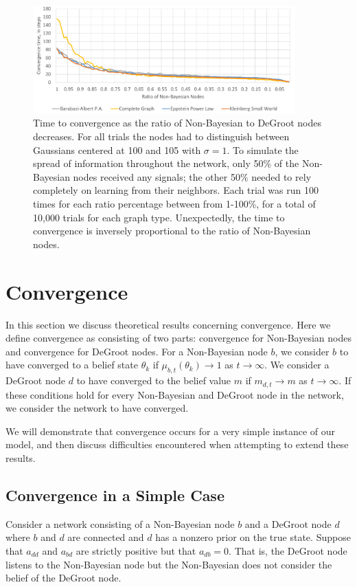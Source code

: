 \documentclass[letterpaper, 11pt, conference]{ieeeconf}
\begin{document}
\begin{figure}[t]
\centering
\includegraphics[width=0.9\textwidth]{figures/nb_ratio}
\caption{Time to convergence as the ratio of Non-Bayesian to DeGroot nodes decreases. For all trials the nodes had to distinguish between Gaussians centered at 100 and 105 with $\sigma=1$. To simulate the spread of information throughout the network, only 50\% of the Non-Bayesian nodes received any signals; the other 50\% needed to rely completely on learning from their neighbors. Each trial was run 100 times for each ratio percentage between from 1-100\%, for a total of 10,000 trials for each graph type. Unexpectedly, the time to convergence is inversely proportional to the ratio of Non-Bayesian nodes.}
\label{fig:nb_ratio}
\end{figure}

\section{Convergence}
In this section we discuss theoretical results concerning convergence.  Here we define convergence as consisting of two parts: convergence for Non-Bayesian nodes and convergence for DeGroot nodes.  For a Non-Bayesian node $b$, we consider $b$ to have converged to a belief state $\theta_{k}$ if $\mu_{b,t}(\theta_k) \to 1$ as $t \to \infty$.  We consider a DeGroot node $d$ to have converged to the belief value $m$ if $m_{d,t} \to m$ as $t \to \infty$.  If these conditions hold for every Non-Bayesian and DeGroot node in the network, we consider the network to have converged.

We will demonstrate that convergence occurs for a very simple instance of our model, and then discuss difficulties encountered when attempting to extend these results.


\subsection{Convergence in a Simple Case}
Consider a network consisting of a Non-Bayesian node $b$ and a DeGroot node $d$ where $b$ and $d$ are connected and $d$ has a nonzero prior on the true state.  Suppose that $a_{dd}$ and $a_{bd}$ are strictly positive but that $a_{db} = 0$.  That is, the DeGroot node listens to the Non-Bayesian node but the Non-Bayesian does not consider the belief of the DeGroot node.
\end{document}
